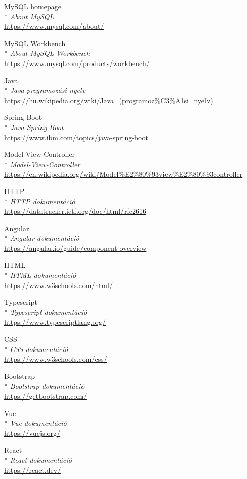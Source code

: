 \begin{thebibliography}{x}
 MySQL homepage\\*
\textit{About MySQL}
\\ \url{https://www.mysql.com/about/}

 MySQL Workbench\\*
\textit{About MySQL Workbench}
\\ \url{https://www.mysql.com/products/workbench/}

 Java\\*
\textit{Java programozási nyelv}
\\ \url{https://hu.wikipedia.org/wiki/Java_(programoz%C3%A1si_nyelv)}

 Spring Boot\\*
\textit{Java Spring Boot}
\\ \url{https://www.ibm.com/topics/java-spring-boot}

 Model-View-Controller\\*
\textit{Model-View-Controller}
\\ \url{https://en.wikipedia.org/wiki/Model%E2%80%93view%E2%80%93controller}

 HTTP\\*
\textit{HTTP dokumentáció}
\\ \url{https://datatracker.ietf.org/doc/html/rfc2616}

 Angular\\*
\textit{Angular dokumentáció}
\\ \url{https://angular.io/guide/component-overview}

 HTML\\*
\textit{HTML dokumentáció}
\\ \url{https://www.w3schools.com/html/}

 Typescript\\*
\textit{Typescript dokumentáció}
\\ \url{https://www.typescriptlang.org/}

 CSS\\*
\textit{CSS dokumentáció}
\\ \url{https://www.w3schools.com/css/}

 Bootstrap\\*
\textit{Bootstrap dokumentáció}
\\ \url{https://getbootstrap.com/}

 Vue\\*
\textit{Vue dokumentáció}
\\ \url{https://vuejs.org/}

 React\\*
\textit{React dokumentáció}
\\ \url{https://react.dev/}









\end{thebibliography}
